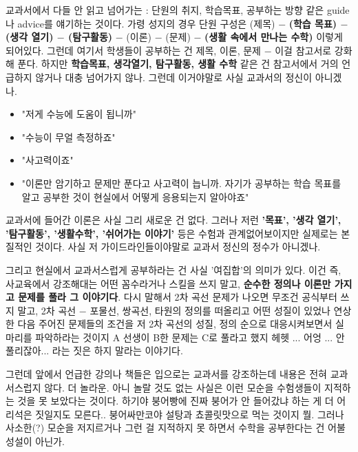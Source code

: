 교과서에서 다들 안 읽고 넘어가는 : 단원의 취지, 학습목표, 공부하는 방향 같은 guide나 advice를 얘기하는 것이다.
가령 성지의 경우 단원 구성은
(제목) $-$ \textbf{(학습 목표) $-$ (생각 열기) $-$ (탐구활동)} $-$ (이론) $-$ (문제) $-$ \textbf{(생활 속에서 만나는 수학)}
이렇게 되어있다.
그런데 여기서 학생들이 공부하는 건 제목, 이론, 문제 $-$ 이걸 참고서로 강화해 푼다.
하지만 \textbf{학습목표, 생각열기, 탐구활동, 생활 수학} 같은 건 참고서에서 거의 언급하지 않거나 대충 넘어가지 않나.
그런데 이거야말로 사실 교과서의 정신이 아니겠나.
\vspace{5mm}

\begin{itemize}
    \item[] "저게 수능에 도움이 됩니까"
    \item[] "수능이 무얼 측정하죠"
    \item[] "사고력이죠"
    \item[] "이론만 암기하고 문제만 푼다고 사고력이 늡니까. 자기가 공부하는 학습 목표를 알고 공부한 것이 현실에서 어떻게 응용되는지 알아야죠"
\end{itemize}
\vspace{5mm}

교과서에 들어간 이론은 사실 그리 새로운 건 없다.
그러나 저런 \textbf{'목표', '생각 열기', '탐구활동', '생활수학', '쉬어가는 이야기'} 등은 수험과 관계없어보이지만 실제로는 본질적인 것이다.
사실 저 가이드라인들이야말로 교과서 정신의 정수가 아니겠나.
\vspace{5mm}

그리고 현실에서 교과서스럽게 공부하라는 건 사실 '여집합'의 의미가 있다.
이건 즉, 사교육에서 강조해대는 어떤 꼼수라거나 스킬을 쓰지 말고, \textbf{순수한 정의나 이론만 가지고 문제를 풀라 그 이야기다}.
다시 말해서 2차 곡선 문제가 나오면 무조건 공식부터 쓰지 말고,
2차 곡선 $-$ 포물선, 쌍곡선, 타원의 정의를 떠올리고 어떤 성질이 있었나 연상한 다음
주어진 문제들의 조건을 저 2차 곡선의 성질, 정의 순으로 대응시켜보면서 실마리를 파악하라는 것이지
A 선생이 B한 문제는 C로 풀라고 했지 헤헷 ... 어엉 ... 안 풀리잖아... 라는 짓은 하지 말라는 이야기다.
\vspace{5mm}

그런데 앞에서 언급한 강의나 책들은 입으로는 교과서를 강조하는데 내용은 전혀 교과서스럽지 않다.
더 놀라운. 아니 놀랄 것도 없는 사실은 이런 모순을 수험생들이 지적하는 것을 못 보았다는 것이다.
하기야 붕어빵에 진짜 붕어가 안 들어갔냐 하는 게 더 어리석은 짓일지도 모른다.. 붕어싸만코야 설탕과 쵸콜릿맛으로 먹는 것이지 뭘.
그러나 사소한(?) 모순을 저지르거나 그런 걸 지적하지 못 하면서 수학을 공부한다는 건 어불성설이 아닌가.
\vspace{5mm}


